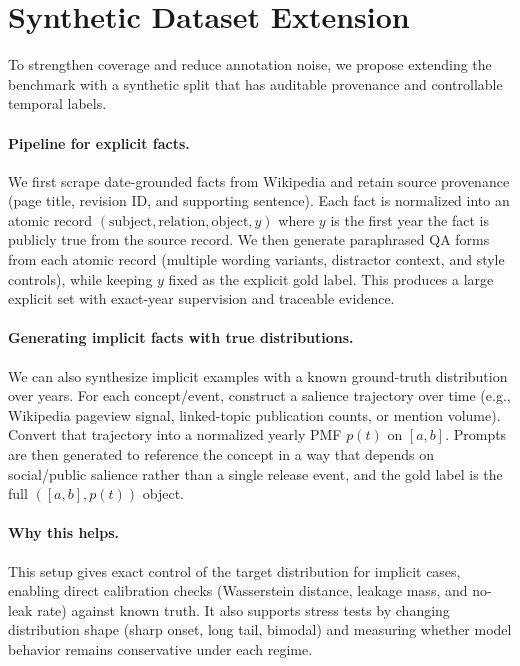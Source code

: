 \section{Synthetic Dataset Extension}
\label{sec:synthetic-dataset}
To strengthen coverage and reduce annotation noise, we propose extending the benchmark with a synthetic split that has auditable provenance and controllable temporal labels.

\paragraph{Pipeline for explicit facts.}
We first scrape date-grounded facts from Wikipedia and retain source provenance (page title, revision ID, and supporting sentence). Each fact is normalized into an atomic record $(\text{subject}, \text{relation}, \text{object}, y)$ where $y$ is the first year the fact is publicly true from the source record. We then generate paraphrased QA forms from each atomic record (multiple wording variants, distractor context, and style controls), while keeping $y$ fixed as the explicit gold label. This produces a large explicit set with exact-year supervision and traceable evidence.

\paragraph{Generating implicit facts with true distributions.}
We can also synthesize implicit examples with a known ground-truth distribution over years. For each concept/event, construct a salience trajectory over time (e.g., Wikipedia pageview signal, linked-topic publication counts, or mention volume). Convert that trajectory into a normalized yearly PMF $p(t)$ on $[a,b]$. Prompts are then generated to reference the concept in a way that depends on social/public salience rather than a single release event, and the gold label is the full $( [a,b], p(t) )$ object.

\paragraph{Why this helps.}
This setup gives exact control of the target distribution for implicit cases, enabling direct calibration checks (Wasserstein distance, leakage mass, and no-leak rate) against known truth. It also supports stress tests by changing distribution shape (sharp onset, long tail, bimodal) and measuring whether model behavior remains conservative under each regime.
